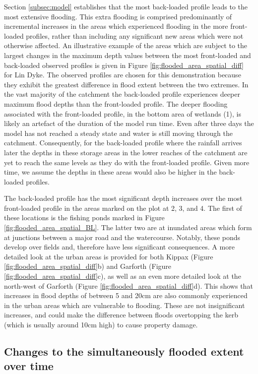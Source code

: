 \documentclass[APA,Times2COL]{WileyNJDv5}
\begin{document}
Section \ref{subsec:model} establishes that the most back-loaded profile leads to the most extensive flooding. This extra flooding is comprised predominantly of incremental increases in the areas which experienced flooding in the more front-loaded profiles, rather than including any significant new areas which were not otherwise affected. An illustrative example of the areas which are subject to the largest changes in the maximum depth values between the most front-loaded and back-loaded observed profiles is given in Figure \ref{fig:flooded_area_spatial_diff} for Lin Dyke. The observed profiles are chosen for this demonstration because they exhibit the greatest difference in flood extent between the two extremes. In the vast majority of the catchment the back-loaded profile experiences deeper maximum flood depths than the front-loaded profile. The deeper flooding associated with the front-loaded profile, in the bottom area of wetlands (1), is likely an artefact of the duration of the model run time. Even after three days the model has not reached a steady state and water is still moving through the catchment. Consequently, for the back-loaded profile where the rainfall arrives later the depths in these storage areas in the lower reaches of the catchment are yet to reach the same levels as they do with the front-loaded profile. Given more time, we assume the depths in these areas would also be higher in the back-loaded profiles. 

The back-loaded profile has the most significant depth increases over the most front-loaded profile in the areas marked on the plot at 2, 3, and 4. The first of these locations is the fishing ponds marked in Figure \ref{fig:flooded_area_spatial_BL}. The latter two are at inundated areas which form at junctions between a major road and the watercourse. Notably, these ponds develop over fields and, therefore have less significant consequences. A more detailed look at the urban areas is provided for both Kippax (Figure \ref{fig:flooded_area_spatial_diff}b) and Garforth (Figure \ref{fig:flooded_area_spatial_diff}c), as well as an even more detailed look at the north-west of Garforth (Figure \ref{fig:flooded_area_spatial_diff}d). This shows that increases in flood depths of between 5 and 20cm are also commonly experienced in the urban areas which are vulnerable to flooding. These are not insignificant increases, and could make the difference between floods overtopping the kerb (which is usually around 10cm high) to cause property damage. 

\subsection{Changes to the simultaneously flooded extent over time}\label{subsec:flood_over_time}
\end{document}
